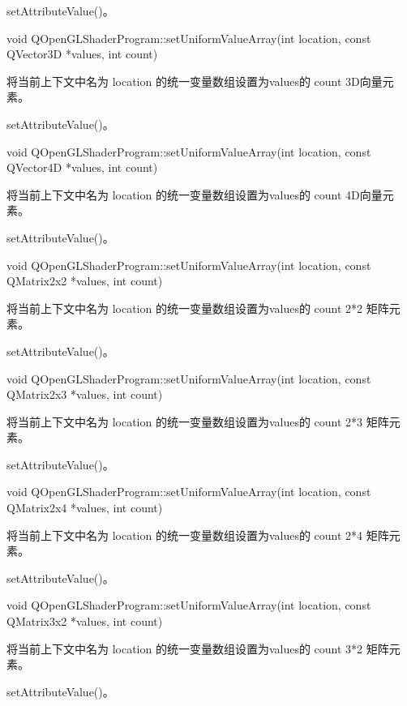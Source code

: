 \begin{seeAlso}
setAttributeValue()。
\end{seeAlso}

void QOpenGLShaderProgram::setUniformValueArray(int location, const QVector3D *values, int count)

将当前上下文中名为 location 的统一变量数组设置为values的 count 3D向量元素。

\begin{seeAlso}
setAttributeValue()。
\end{seeAlso}

void QOpenGLShaderProgram::setUniformValueArray(int location, const QVector4D *values, int count)

将当前上下文中名为 location 的统一变量数组设置为values的 count 4D向量元素。

\begin{seeAlso}
setAttributeValue()。
\end{seeAlso}

void QOpenGLShaderProgram::setUniformValueArray(int location, const QMatrix2x2 *values, int count)

将当前上下文中名为 location 的统一变量数组设置为values的 count 2*2 矩阵元素。

\begin{seeAlso}
setAttributeValue()。
\end{seeAlso}

void QOpenGLShaderProgram::setUniformValueArray(int location, const QMatrix2x3 *values, int count)

将当前上下文中名为 location 的统一变量数组设置为values的 count 2*3 矩阵元素。

\begin{seeAlso}
setAttributeValue()。
\end{seeAlso}

void QOpenGLShaderProgram::setUniformValueArray(int location, const QMatrix2x4 *values, int count)

将当前上下文中名为 location 的统一变量数组设置为values的 count 2*4 矩阵元素。

\begin{seeAlso}
setAttributeValue()。
\end{seeAlso}

void QOpenGLShaderProgram::setUniformValueArray(int location, const QMatrix3x2 *values, int count)

将当前上下文中名为 location 的统一变量数组设置为values的 count 3*2 矩阵元素。

\begin{seeAlso}
setAttributeValue()。
\end{seeAlso}

